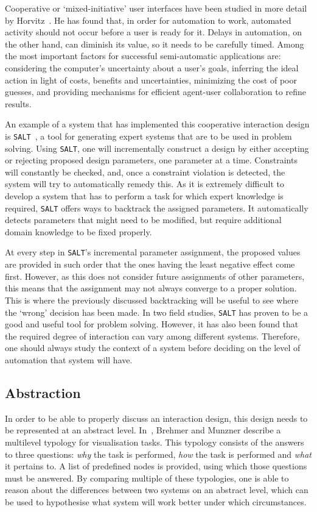 Cooperative or `mixed-initiative' user interfaces have been studied in more detail by Horvitz~\cite{horvitz1999principles}. He has found that, in order for automation to work, automated activity should not occur before a user is ready for it. Delays in automation, on the other hand, can diminish its value, so it needs to be carefully timed. Among the most important factors for successful semi-automatic applications are: considering the computer's uncertainty about a user's goals, inferring the ideal action in light of costs, benefits and uncertainties, minimizing the cost of poor guesses, and providing mechanisms for efficient agent-user collaboration to refine results.

An example of a system that has implemented this cooperative interaction design is \verb|SALT|~\cite{marcus1987taking}, a tool for generating expert systems that are to be used in problem solving. Using \verb|SALT|, one will incrementally construct a design by either accepting or rejecting proposed design parameters, one parameter at a time. Constraints will constantly be checked, and, once a constraint violation is detected, the system will try to automatically remedy this. As it is extremely difficult to develop a system that has to perform a task for which expert knowledge is required, \verb|SALT| offers ways to backtrack the assigned parameters. It automatically detects parameters that might need to be modified, but require additional domain knowledge to be fixed properly.

At every step in \verb|SALT|'s incremental parameter assignment, the proposed values are provided in such order that the ones having the least negative effect come first. However, as this does not consider future assignments of other parameters, this means that the assignment may not always converge to a proper solution. This is where the previously discussed backtracking will be useful to see where the `wrong' decision has been made. In two field studies, \verb|SALT| has proven to be a good and useful tool for problem solving. However, it has also been found that the required degree of interaction can vary among different systems. Therefore, one should always study the context of a system before deciding on the level of automation that system will have.


\subsection{Abstraction}
In order to be able to properly discuss an interaction design, this design needs to be represented at an abstract level. In~\cite{brehmer2013multi}, Brehmer and Munzner describe a multilevel typology for visualisation tasks. This typology consists of the answers to three questions: \textit{why} the task is performed, \textit{how} the task is performed and \textit{what} it pertains to. A list of predefined nodes is provided, using which those questions must be answered. By comparing multiple of these typologies, one is able to reason about the differences between two systems on an abstract level, which can be used to hypothesise what system will work better under which circumstances.



